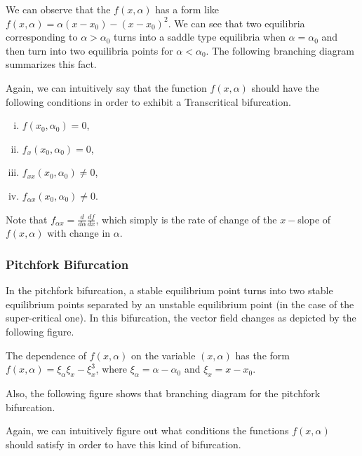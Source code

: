 

We can observe that the $f(x,\alpha)$ has a form like $f(x,\alpha) = \alpha (x-x_0) - (x-x_0)^2$. We can see that two equilibria corresponding to $\alpha>\alpha_0$ turns into a saddle type equilibria when $\alpha = \alpha_0$ and then turn into two equilibria points for $\alpha<\alpha_0$. The following branching diagram summarizes this fact.



Again, we can intuitively say that the function $f(x,\alpha)$ should have the following conditions in order to exhibit a Transcritical bifurcation.

\begin{enumerate}[(i)]
	\item $f(x_0,\alpha_0) = 0$,
	\item $f_x(x_0,\alpha_0) = 0$,
	\item $f_{xx}(x_0,\alpha_0) \neq  0$,
	\item $f_{\alpha x} (x_0,\alpha_0) \neq 0$.
\end{enumerate}
Note that $f_{\alpha x} = \frac{d}{d\alpha} \frac{df}{dx}$, which simply is the rate of change of the $x-$slope of $f(x,\alpha)$ with change in $\alpha$.


\subsubsection{Pitchfork Bifurcation}
In the pitchfork bifurcation, a stable equilibrium point turns into two stable equilibrium points separated by an unstable equilibrium point (in the case of the super-critical one). In this bifurcation, the vector field changes as depicted by the following figure.


The dependence of $f(x,\alpha)$ on the variable $(x,\alpha)$ has the form $f(x,\alpha) = \xi_\alpha \xi_x - \xi_x^3$, where $\xi_\alpha = \alpha - \alpha_0$ and $\xi_x = x - x_0$.

Also, the following figure shows that branching diagram for the pitchfork bifurcation.


Again, we can intuitively figure out what conditions the functions $f(x,\alpha)$ should satisfy in order to have this kind of bifurcation.

